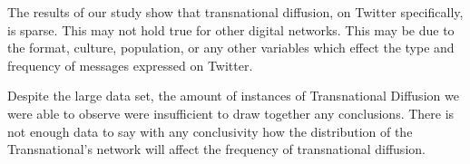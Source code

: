 The results of our study show that transnational diffusion, on Twitter
specifically, is sparse. This may not hold true for other digital
networks. This may be due to the format, culture, population, or any
other variables which effect the type and frequency of messages
expressed on Twitter.

Despite the large data set, the amount of instances of Transnational
Diffusion we were able to observe were insufficient to draw together
any conclusions. There is not enough data to say with any conclusivity
how the distribution of the Transnational's network will affect the
frequency of transnational diffusion.
